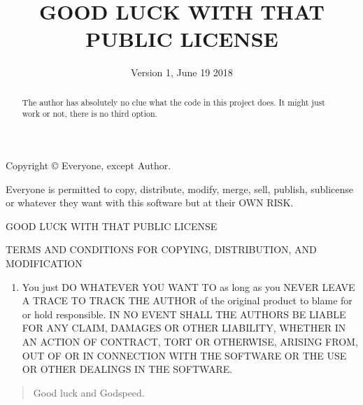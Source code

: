 \documentclass{article}
\date{Version 1, June 19 2018}
\title{GOOD LUCK WITH THAT PUBLIC LICENSE}
\begin{document}
\maketitle
Copyright \copyright\text{ }  Everyone, except Author.

\begin{center}
Everyone is permitted to copy, distribute, modify, merge, sell, publish,
sublicense or whatever they want with this software but at their OWN RISK.
\end{center}

\bigskip

\renewcommand{\abstractname}{Preamble}
\begin{abstract}
 The author has absolutely no clue what the code in this project does.
It might just work or not, there is no third option.
\end{abstract}

\bigskip

\begin{center}
GOOD LUCK WITH THAT PUBLIC LICENSE

TERMS AND CONDITIONS FOR COPYING, DISTRIBUTION, AND MODIFICATION
\end{center}

\begin{enumerate}
  \addtocounter{enumi}{-1}
\item You just DO WHATEVER YOU WANT TO as long as you NEVER LEAVE A TRACE TO TRACK
THE AUTHOR of the original product to blame for or hold responsible. \newline
\newline IN NO EVENT SHALL THE AUTHORS BE LIABLE FOR ANY CLAIM, DAMAGES OR
OTHER LIABILITY, WHETHER IN AN ACTION OF CONTRACT, TORT OR OTHERWISE, ARISING
FROM, OUT OF OR IN CONNECTION WITH THE SOFTWARE OR THE USE OR OTHER DEALINGS
IN THE SOFTWARE.
\end{enumerate}
\bigskip
\begin{quote}
Good luck and Godspeed.
\end{quote}
\end{document}
